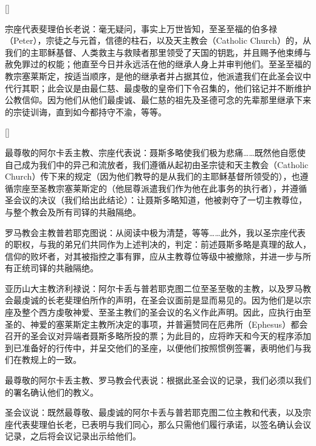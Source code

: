 []\par

宗座代表斐理伯长老说：毫无疑问，事实上万世皆知，至圣至福的伯多禄（Peter），宗徒之与元首，信德的柱石，以及天主教会（Catholic Church）的，从我们的主耶稣基督、人类救主与救赎者那里领受了天国的钥匙，并且赐予他束缚与赦免罪过的权能；他直至今日并永远活在他的继承人身上并审判他们。至圣至福的教宗塞莱斯定，按适当顺序，是他的继承者并占据其位，他派遣我们在此圣会议中代行其职；此会议是由最仁慈、最虔敬的皇帝们下令召集的，他们铭记并不断维护公教信仰。因为他们从他们最虔诚、最仁慈的祖先及圣德可念的先辈那里继承下来的宗徒训诲，直到如今都持守不渝，等等。\par

[]\par

最尊敬的阿尔卡丢主教、宗座代表说：聂斯多略使我们极为悲痛……既然他自愿使自己成为我们中的异己和流放者，我们遵循从起初由圣宗徒和天主教会（Catholic Church）传下来的规定（因为他们教导的是从我们的主耶稣基督所领受的），也遵循宗座至圣教宗塞莱斯定的（他屈尊派遣我们作为他在此事务的执行者），并遵循圣会议的决议（我们给出此结论）：让聂斯多略知道，他被剥夺了一切主教尊位，与整个教会及所有司铎的共融隔绝。\par

罗马教会主教普若耶克图说：从阅读中极为清楚，等等……此外，我以圣宗座代表的职权，与我的弟兄们共同作为上述判决的，判定：前述聂斯多略是真理的敌人，信仰的败坏者，对其被指控之事有罪，应从主教尊位等级中被撤除，并进一步与所有正统司铎的共融隔绝。\par

亚历山大主教济利禄说：阿尔卡丢与普若耶克图二位至圣至敬的主教，以及罗马教会最虔诚的长老斐理伯所作的声明，在圣会议面前是显而易见的。因为他们是以宗座及整个西方虔敬神爱、至圣主教们的圣会议的名义作此声明。因此，应执行由至圣的、神爱的塞莱斯定主教所决定的事项，并普遍赞同在厄弗所（Ephesus）都会召开的圣会议对异端者聂斯多略所投的票；为此目的，应将昨天和今天的程序添加到已准备好的行传中，并呈交他们的圣座，以便他们按照惯例签署，表明他们与我们在教规上的一致。\par

最尊敬的阿尔卡丢主教、罗马教会代表说：根据此圣会议的记录，我们必须以我们的署名确认他们的教义。\par

圣会议说：既然最尊敬、最虔诚的阿尔卡丢与普若耶克图二位主教和代表，以及宗座代表斐理伯长老，已表明与我们同心，那么只需他们履行承诺，以签名确认会议记录，之后将会议记录出示给他们。\par

